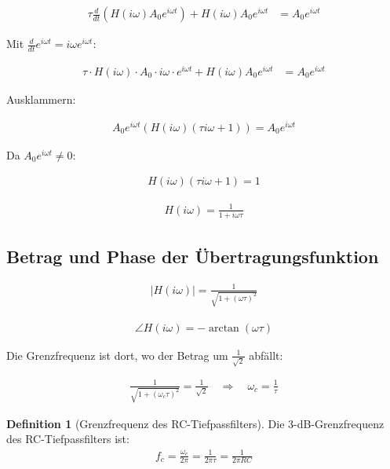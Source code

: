 \documentclass[a4paper, 12pt, twoside, openright]{report}
\theoremstyle{definition}
\newtheorem{definition}[theorem]{Definition}
\theoremstyle{definition}
\begin{document}
\begin{align}
	\tau \frac{d}{dt}(H(i\omega) A_0 e^{i\omega t}) + H(i\omega) A_0 e^{i\omega t} &= A_0 e^{i\omega t}
\end{align}

Mit $\frac{d}{dt} e^{i\omega t} = i\omega e^{i\omega t}$:

\begin{align}
	\tau \cdot H(i\omega) \cdot A_0 \cdot i\omega \cdot e^{i\omega t} + H(i\omega) A_0 e^{i\omega t} &= A_0 e^{i\omega t}
\end{align}

Ausklammern:

\begin{align}
	A_0 e^{i\omega t} (H(i\omega)(\tau i\omega + 1)) = A_0 e^{i\omega t}
\end{align}

Da $A_0 e^{i\omega t} \neq 0$:

\begin{align}
	H(i\omega) (\tau i\omega + 1) = 1
\end{align}

\begin{align}
	H(i\omega) = \frac{1}{1 + i\omega\tau}
\end{align}

\subsection{Betrag und Phase der Übertragungsfunktion}

\begin{align}
	|H(i\omega)| = \frac{1}{\sqrt{1 + (\omega\tau)^2}}
\end{align}

\begin{align}
	\angle H(i\omega) = -\arctan(\omega\tau)
\end{align}

Die Grenzfrequenz ist dort, wo der Betrag um $\frac{1}{\sqrt{2}}$ abfällt:

\begin{align}
	\frac{1}{\sqrt{1 + (\omega_c\tau)^2}} = \frac{1}{\sqrt{2}} \quad \Rightarrow \quad \omega_c = \frac{1}{\tau}
\end{align}

\begin{definition}[Grenzfrequenz des RC-Tiefpassfilters]
	Die 3-dB-Grenzfrequenz des RC-Tiefpassfilters ist:
	\begin{align}
		f_c = \frac{\omega_c}{2\pi} = \frac{1}{2\pi\tau} = \frac{1}{2\pi RC}
	\end{align}
\end{definition}
\end{document}
